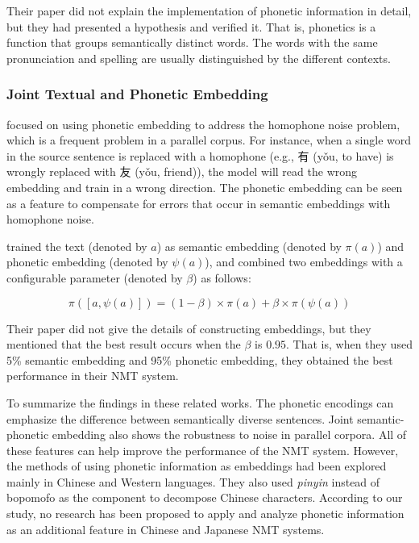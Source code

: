 Their paper did not explain the implementation of phonetic information in detail, but they had presented a hypothesis and verified it. That is, phonetics is a function that groups semantically distinct words. The words with the same pronunciation and spelling are usually distinguished by the different contexts.

\subsubsection{Joint Textual and Phonetic Embedding}

\cite{liu-etal-2019-robust} focused on using phonetic embedding to address the homophone noise problem, which is a frequent problem in a parallel corpus. For instance, when a single word in the source sentence is replaced with a homophone (e.g., 有 (yǒu, to have) is wrongly replaced with 友 (yǒu, friend)), the model will read the wrong embedding and train in a wrong direction. The phonetic embedding can be seen as a feature to compensate for errors that occur in semantic embeddings with homophone noise.

\cite{liu-etal-2019-robust} trained the text (denoted by $a$) as semantic embedding (denoted by $\pi(a)$) and phonetic embedding (denoted by $\psi(a)$), and combined two embeddings with a configurable parameter (denoted by $\beta$) as follows:

\begin{equation*}
	\pi([a, \psi(a)]) = (1-\beta) \times \pi(a) + \beta \times \pi(\psi(a)) 
\end{equation*}

Their paper did not give the details of constructing embeddings, but they mentioned that the best result occurs when the $\beta$ is $0.95$. That is, when they used 5\% semantic embedding and 95\% phonetic embedding, they obtained the best performance in their NMT system.

To summarize the findings in these related works. The phonetic encodings can emphasize the difference between semantically diverse sentences. Joint semantic-phonetic embedding also shows the robustness to noise in parallel corpora. All of these features can help improve the performance of the NMT system. However, the methods of using phonetic information as embeddings had been explored mainly in Chinese and Western languages. They also used \textit{pinyin} instead of bopomofo as the component to decompose Chinese characters. According to our study, no research has been proposed to apply and analyze phonetic information as an additional feature in Chinese and Japanese NMT systems.

